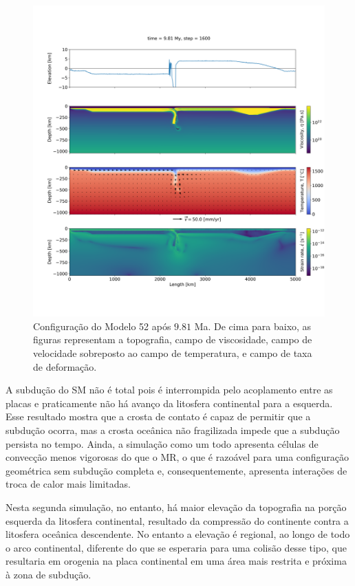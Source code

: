 \begin{figure}
    \centering
    \includegraphics[trim={1.5cm 3.5cm 0.0cm 4cm}, clip, width=1.0 \textwidth]{fig/strak_52-11.png}
    \caption{Configuração do Modelo 52 após $9.81$ Ma. De cima para baixo, as figuras representam a topografia, campo de viscosidade, campo de velocidade sobreposto ao campo de temperatura, e campo de taxa de deformação.}
    \label{fig:stra_52-11}
\end{figure}

A subdução do SM não é total pois é interrompida pelo acoplamento entre as placas e praticamente não há avanço da litosfera continental para a esquerda. Esse resultado mostra que a crosta de contato é capaz de permitir que a subdução ocorra, mas a crosta oceânica não fragilizada impede que a subdução persista no tempo. Ainda, a simulação como um todo apresenta células de convecção menos vigorosas do que o MR, o que é razoável para uma configuração geométrica sem subdução completa e, consequentemente, apresenta interações de troca de calor mais limitadas.

Nesta segunda simulação, no entanto, há maior elevação da topografia na porção esquerda da litosfera continental, resultado da compressão do continente contra a litosfera oceânica descendente. No entanto a elevação é regional,  ao longo de todo o arco continental, diferente do que se esperaria para uma colisão desse tipo, que resultaria em orogenia na placa continental em uma área mais restrita e próxima à zona de subdução. 

